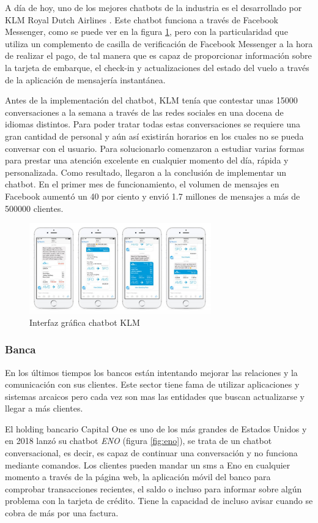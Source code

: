 A día de hoy, uno de los mejores chatbots de la industria es el desarrollado por KLM Royal Dutch Airlines \cite{klm}. Este chatbot funciona a través de Facebook Messenger, como se puede ver en la figura \ref{fig:klm}, pero con la particularidad que utiliza un complemento de casilla de verificación de Facebook Messenger a la hora de realizar el pago, de tal manera que es capaz de proporcionar información sobre la tarjeta de embarque, el check-in y actualizaciones del estado del vuelo a través de la aplicación de mensajería instantánea.

Antes de la implementación del chatbot, KLM tenía que contestar unas 15000 conversaciones a la semana a través de las redes sociales en una docena de idiomas distintos. Para poder tratar todas estas conversaciones se requiere una gran cantidad de personal y aún así existirán horarios en los cuales no se pueda conversar con el usuario. Para solucionarlo comenzaron a estudiar varias formas para prestar una atención excelente en cualquier momento del día, rápida y personalizada. Como resultado, llegaron a la conclusión de implementar un chatbot. 
En el primer mes de funcionamiento, el volumen de mensajes en Facebook aumentó un 40 por ciento y envió 1.7 millones de mensajes a más de 500000 clientes.

\begin{figure}[H]
    \centering
    \includegraphics[width=0.7\textwidth]{include/figuras/klm-chatbot.jpg}
    \caption{Interfaz gráfica chatbot KLM}
    \label{fig:klm}
\end{figure}


\subsubsection{Banca}
En los últimos tiempos los bancos están intentando mejorar las relaciones y la comunicación con sus clientes. Este sector tiene fama de utilizar aplicaciones y sistemas arcaicos pero cada vez son mas las entidades que buscan actualizarse y llegar a más clientes. 

El holding bancario Capital One \cite{eno} es uno de los más grandes de Estados Unidos y en 2018 lanzó su chatbot \textit{ENO} (figura \ref{fig:eno}), se trata de un chatbot conversacional, es decir, es capaz de continuar una conversación y no funciona mediante comandos. Los clientes pueden mandar un sms a Eno en cualquier momento a través de la página web, la aplicación móvil del banco para comprobar transacciones recientes, el saldo o incluso para informar sobre algún problema con la tarjeta de crédito. Tiene la capacidad de incluso avisar cuando se cobra de más por una factura.

